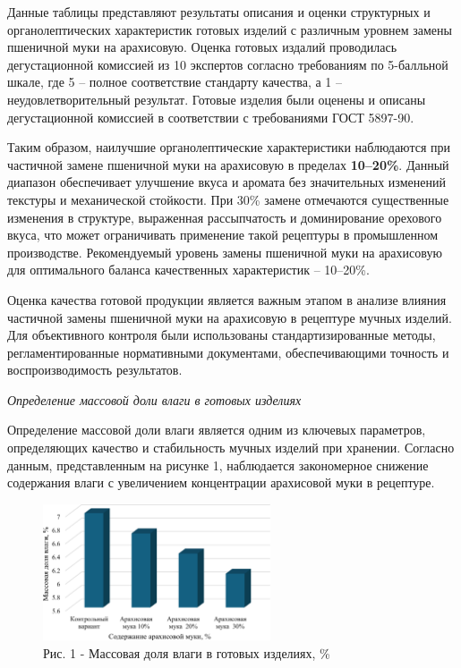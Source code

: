 \begin{multicols}{2}
Данные таблицы представляют результаты описания и оценки структурных и
органолептических характеристик готовых изделий с различным уровнем
замены пшеничной муки на арахисовую. Оценка готовых издалий проводилась
дегустационной комиссией из 10 экспертов согласно требованиям по
5-балльной шкале, где 5 -- полное соответствие стандарту качества, а 1
-- неудовлетворительный результат. Готовые изделия были оценены и
описаны дегустационной комиссией в соответствии с требованиями ГОСТ
5897-90.

Таким образом, наилучшие органолептические характеристики наблюдаются
при частичной замене пшеничной муки на арахисовую в пределах
{\bfseries 10--20\%}. Данный диапазон обеспечивает улучшение вкуса и
аромата без значительных изменений текстуры и механической стойкости.
При 30\% замене отмечаются существенные изменения в структуре,
выраженная рассыпчатость и доминирование орехового вкуса, что может
ограничивать применение такой рецептуры в промышленном производстве.
Рекомендуемый уровень замены пшеничной муки на арахисовую для
оптимального баланса качественных характеристик -- 10--20\%.

Оценка качества готовой продукции является важным этапом в анализе
влияния частичной замены пшеничной муки на арахисовую в рецептуре мучных
изделий. Для объективного контроля были использованы стандартизированные
методы, регламентированные нормативными документами, обеспечивающими
точность и воспроизводимость результатов.

\emph{Определение массовой доли влаги в готовых изделиях}

Определение массовой доли влаги является одним из ключевых параметров,
определяющих качество и стабильность мучных изделий при хранении.
Согласно данным, представленным на рисунке 1, наблюдается закономерное
снижение содержания влаги с увеличением концентрации арахисовой муки в
рецептуре.
\end{multicols}

\begin{figure}[H]
	\centering
	\includegraphics[width=0.6\textwidth]{media/pish/Graph_11}
	\caption*{Рис. 1 - Массовая доля влаги в готовых изделиях, \%}
\end{figure}

